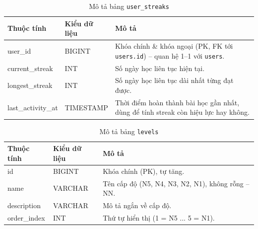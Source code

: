 \documentclass[../DoAn.tex]{subfiles}
\begin{document}
\begin{table}[H]
\centering
\small
\renewcommand{\arraystretch}{1.2}
\begin{tabular}{|p{3.2cm}|p{2.4cm}|p{8cm}|}
\hline
\textbf{Thuộc tính} & \textbf{Kiểu dữ liệu} & \textbf{Mô tả} \\ \hline
user\_id & BIGINT & Khóa chính \& khóa ngoại (PK, FK tới \texttt{users.id}) -- quan hệ 1--1 với \texttt{users}. \\ \hline
current\_streak & INT & Số ngày học liên tục hiện tại. \\ \hline
longest\_streak & INT & Số ngày học liên tục dài nhất từng đạt được. \\ \hline
last\_activity\_at & TIMESTAMP & Thời điểm hoàn thành bài học gần nhất, dùng để tính streak còn hiệu lực hay không. \\ \hline
\end{tabular}
\renewcommand{\arraystretch}{1}
\caption{Mô tả bảng \texttt{user\_streaks}}
\label{table:db-user-streaks}
\end{table}

\begin{table}[H]
\centering
\small
\renewcommand{\arraystretch}{1.2}
\begin{tabular}{|p{3.2cm}|p{2.4cm}|p{8cm}|}
\hline
\textbf{Thuộc tính} & \textbf{Kiểu dữ liệu} & \textbf{Mô tả} \\ \hline
id & BIGINT & Khóa chính (PK), tự tăng. \\ \hline
name & VARCHAR & Tên cấp độ (N5, N4, N3, N2, N1), không rỗng -- NN. \\ \hline
description & VARCHAR & Mô tả ngắn về cấp độ. \\ \hline
order\_index & INT & Thứ tự hiển thị (1 = N5 ... 5 = N1). \\ \hline
\end{tabular}
\renewcommand{\arraystretch}{1}
\caption{Mô tả bảng \texttt{levels}}
\label{table:db-levels}
\end{table}
\end{document}
